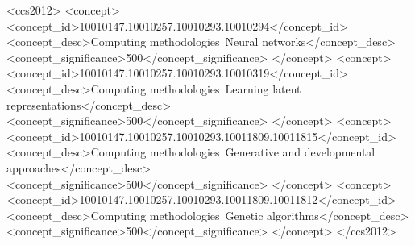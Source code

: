 \documentclass[sigconf]{acmart}
\begin{document}
%
%
\begin{CCSXML}
<ccs2012>
   <concept>
       <concept_id>10010147.10010257.10010293.10010294</concept_id>
       <concept_desc>Computing methodologies~Neural networks</concept_desc>
       <concept_significance>500</concept_significance>
       </concept>
   <concept>
       <concept_id>10010147.10010257.10010293.10010319</concept_id>
       <concept_desc>Computing methodologies~Learning latent representations</concept_desc>
       <concept_significance>500</concept_significance>
       </concept>
   <concept>
       <concept_id>10010147.10010257.10010293.10011809.10011815</concept_id>
       <concept_desc>Computing methodologies~Generative and developmental approaches</concept_desc>
       <concept_significance>500</concept_significance>
       </concept>
   <concept>
       <concept_id>10010147.10010257.10010293.10011809.10011812</concept_id>
       <concept_desc>Computing methodologies~Genetic algorithms</concept_desc>
       <concept_significance>500</concept_significance>
       </concept>
 </ccs2012>
\end{CCSXML}





\maketitle




 

\end{document}
